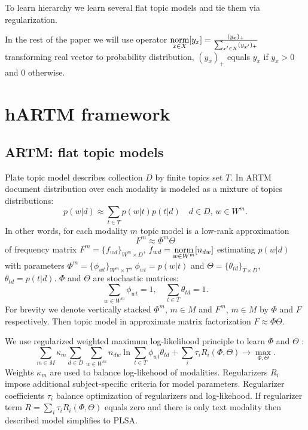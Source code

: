 \documentclass[12pt, twoside]{article}
\begin{document}
To learn hierarchy we learn several flat topic models and tie them via regularization.

In the rest of the paper we will use operator 
$\mathop{\text{norm}}\limits_{x \in X} [y_x] = \frac{( y_x )_+}
{\sum_{x' \in X}( y_{x'})_+}$ transforming real vector to probability distribution, $(y_x)_+$ equals $y_x$ if $y_x > 0$ and $0$ otherwise.



\section{hARTM framework}
\label{hARTM} 
\subsection{ARTM: flat topic models}
Plate topic model describes collection $D$ by finite topics set $T$. In ARTM~\cite{ARTM} document distribution over each modality is modeled as a mixture of topics distributions:
\[
p(w|d) \approx \sum_{t \in T} p(w|t) p(t|d)   \quad  d \in D, \, w \in W^m.
\]
In other words, for each modality $m$ topic model is a low-rank approximation 
\[
F^m\approx \Phi^m \Theta
\]
of frequency matrix $F^m = \{f_{wd}\}_{W^m \times D}$, $f_{wd} = \mathop{\text{norm}}\limits_{w \in W^m} [n_{dw}]$ estimating $p(w|d)$ with parameters $\Phi^m = \{\phi_{wt}\}_{W^m \times T}$, $\phi_{wt} = p(w|t)$ and $\Theta = \{\theta_{td}\}_{T \times D}$, $\theta_{td} = p(t|d)$. $\Phi$ and $\Theta$ are stochastic matrices:
\begin{equation}
	\label{constrains}
\sum_{w \in W^m} \phi_{wt} = 1, \quad \sum_{t \in T} \theta_{td} = 1.
\end{equation}
For brevity we denote vertically stacked $\Phi^m$, $m \in M$ and $F^m$, $m \in M$ by $\Phi$ and $F$ respectively. Then topic model in approximate matrix factorization $F \approx \Phi \Theta$.

We use regularized weighted maximum log-likelihood principle to learn $\Phi$ and $\Theta$ :
\begin{equation}
\label{optimization_problem}
    \sum_{m \in M} \kappa_m \sum_{d \in D} \sum_{w \in W^m} n_{dw} \ln \sum_{t \in T} \phi_{wt} \theta_{td} + \sum_i \tau_i R_i(\Phi, \Theta) \rightarrow \max_{\Phi, \Theta}.
\end{equation}
Weights $\kappa_m$ are used to balance log-likehood of modalities. Regularizers $R_i$ impose additional subject-specific criteria for model parameters. Regularizer coefficients $\tau_i$ balance optimization of regularizers and log-likehood. If regularizer term $R = \sum_i \tau_i R_i(\Phi, \Theta)$ equals zero and there is only text modality then described model simplifies to PLSA.
\end{document}
